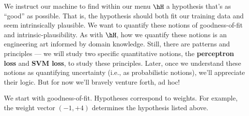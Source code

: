 



{}
  We instruct our machine to find within our menu $\hH$ a hypothesis that's as
  ``good'' as possible.  That is, the hypothesis should both fit our training
  data and seem intrinsically plausible.  We want to quantify these notions of
  goodness-of-fit and intrinsic-plausibility.  As with $\hH$, how we quantify
  these notions is an engineering art informed by domain knowledge.  Still,
  there are patterns and principles --- we will study two specific quantitative
  notions, the \textbf{perceptron loss} and \textbf{SVM loss}, to study these
  principles.
  Later, once we understand these notions as quantifying uncertainty (i.e., as
  probabilistic notions), we'll appreciate their logic.  But for now we'll
  bravely venture forth, ad hoc!

  We start with goodness-of-fit.  Hypotheses correspond to
  weights.  For example, the weight vector $(-1, +4)$ determines the
  hypothesis listed above.

